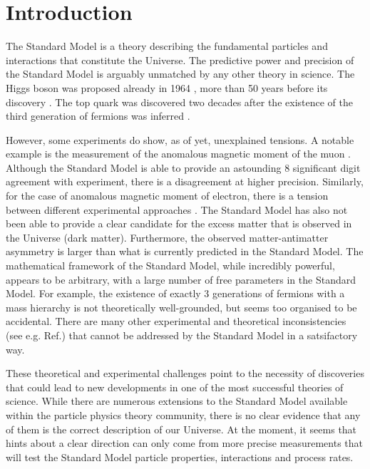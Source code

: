 \chapter{Introduction}\label{sec:introduction}

The Standard Model is a theory describing the fundamental particles and interactions that constitute the Universe.
The predictive power and precision of the Standard Model is arguably unmatched by any other theory in science.
The Higgs boson was proposed already in 1964 \cite{PhysRevLett.13.508}, more than 50 years before its discovery \cite{ATLAS:2012yve,CMS:2012qbp}.
The top quark was discovered \cite{PhysRevLett.74.2632,PhysRevLett.74.2626} two decades after the existence of the third generation of fermions was inferred \cite{HARARI1975265}.

However, some experiments do show, as of yet, unexplained tensions. 
A notable example is the measurement of the anomalous magnetic moment of the muon \cite{PhysRevLett.126.141801}.
Although the Standard Model is able to provide an astounding 8 significant digit agreement with experiment, there is a disagreement at higher precision.
Similarly, for the case of anomalous magnetic moment of electron, there is a tension between different experimental approaches \cite{PhysRevLett.100.120801,Morel:2020dww,Li:2021koa}.
The Standard Model has also not been able to provide a clear candidate for the excess matter that is observed in the Universe (dark matter).
Furthermore, the observed matter-antimatter asymmetry is larger than what is currently predicted in the Standard Model.
The mathematical framework of the Standard Model, while incredibly powerful, appears to be arbitrary, with a large number of free parameters in the Standard Model.
For example, the existence of exactly 3 generations of fermions with a mass hierarchy is not theoretically well-grounded, but seems too organised to be accidental.
There are many other experimental and theoretical inconsistencies (see e.g. Ref.\cite{Ellis:2002wba}) that cannot be addressed by the Standard Model in a satsifactory way.

These theoretical and experimental challenges point to the necessity of discoveries that could lead to new developments in one of the most successful theories of science.
While there are numerous extensions to the Standard Model available within the particle physics theory community, there is no clear evidence that any of them is the correct description of our Universe.
At the moment, it seems that hints about a clear direction can only come from more precise measurements that will test the Standard Model particle properties, interactions and process rates.


